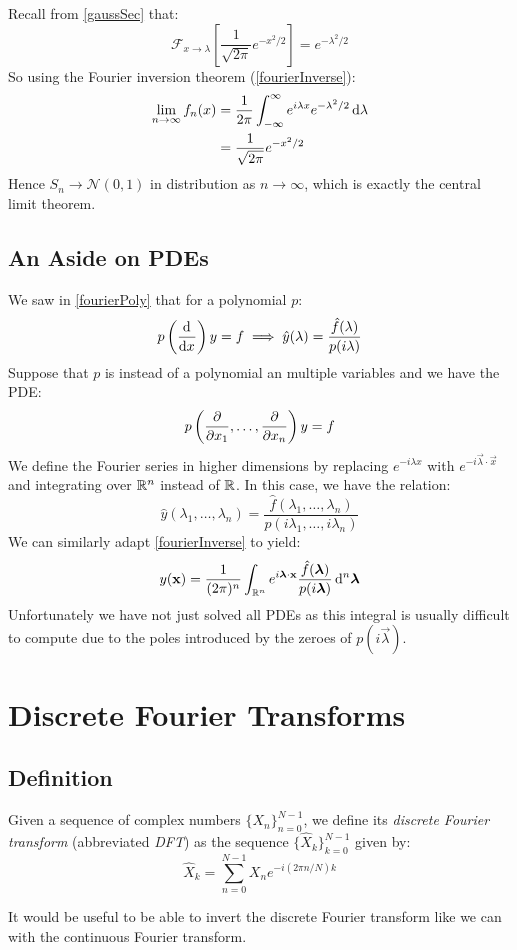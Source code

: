 \documentclass[../main.tex]{subfiles}
\begin{document}
Recall from \cref{gaussSec} that:
\[
  \mathcal{F}_{x \to \lambda}\left[\frac{1}{\sqrt{2\pi}} e^{-x^2/2}\right] = e^{-\lambda^2/2}
\]
So using the Fourier inversion theorem (\cref{fourierInverse}):
\begin{align*}
  \lim_{n \to \infty} f_n(x) &= \frac{1}{2\pi} \int_{-\infty}^{\infty} e^{i \lambda x} e^{-\lambda^2/2} \d{\lambda} \\
                             &= \frac{1}{\sqrt{2\pi}} e^{-x^2/2}
\end{align*}
Hence $S_n \to \mathcal{N}(0, 1)$ in distribution as $n \to \infty$, which is exactly the central limit theorem.
\subsection{An Aside on PDEs}
\nonexaminable
We saw in \cref{fourierPoly} that for a polynomial $p$:
\[
  p\left(\deriv{}{x}\right) y = f \implies \hat{y}(\lambda) = \frac{\hat{f}(\lambda)}{p(i\lambda)}
\]
Suppose that $p$ is instead of a polynomial an multiple variables and we have the PDE:
\[
  p\left(\pderiv{}{x_1}, \ldots, \pderiv{}{x_n}\right) y = f
\]
We define the Fourier series in higher dimensions by replacing $e^{-i \lambda x}$ with $e^{-i \vec{\lambda} \cdot \vec{x}}$ and integrating over $\mathbb{R}^{n}$ instead of $\mathbb{R}$.
In this case, we have the relation:
\[
  \hat{y}(\lambda_1, \ldots, \lambda_n) = \frac{\hat{f}(\lambda_1, \ldots, \lambda_n)}{p(i \lambda_1, \ldots, i \lambda_n)}
\]
We can similarly adapt \cref{fourierInverse} to yield:
\[
  y(\vec{x}) = \frac{1}{(2 \pi)^{n}} \int_{\R^{n}} e^{i \vec{\lambda} \cdot \vec{x}} \frac{\hat{f}(\vec{\lambda})}{p(i \vec{\lambda})} \d^{n}{\vec{\lambda}}
\]
Unfortunately we have not just solved all PDEs as this integral is usually difficult to compute due to the poles introduced by the zeroes of $p(i \vec{\lambda})$.
\section{Discrete Fourier Transforms}
\subsection{Definition}
\begin{definition}
  Given a sequence of complex numbers $\{X_n\}_{n = 0}^{N - 1}$, we define its \textit{discrete Fourier transform} (abbreviated \textit{DFT}) as the sequence $\{\hat{X}_k\}_{k = 0}^{N - 1}$ given by:
  \[
    \hat{X}_k = \sum_{n = 0}^{N - 1} X_n e^{-i(2 \pi n/N)k}
  \]
\end{definition}
It would be useful to be able to invert the discrete Fourier transform like we can with the continuous Fourier transform.
\end{document}
